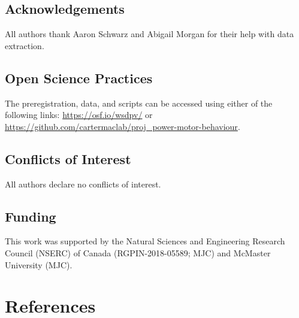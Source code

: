 \documentclass[
  doc, donotrepeattitle,floatsintext]{apa7}
\begin{document}
\hypertarget{acknowledgements}{%
\subsection{Acknowledgements}\label{acknowledgements}}

\noindent All authors thank Aaron Schwarz and Abigail Morgan for their help with data extraction.

\hypertarget{open-science-practices}{%
\subsection{Open Science Practices}\label{open-science-practices}}

\noindent The preregistration, data, and scripts can be accessed using either of the following links: \url{https://osf.io/wsdpv/} or \url{https://github.com/cartermaclab/proj_power-motor-behaviour}.

\hypertarget{conflicts-of-interest}{%
\subsection{Conflicts of Interest}\label{conflicts-of-interest}}

\noindent All authors declare no conflicts of interest.

\hypertarget{funding}{%
\subsection{Funding}\label{funding}}

\noindent This work was supported by the Natural Sciences and Engineering Research Council (NSERC) of Canada (RGPIN-2018-05589; MJC) and McMaster University (MJC).

\pagebreak

\hypertarget{references}{%
\section{References}\label{references}}

\vspace{2ex}
\end{document}
